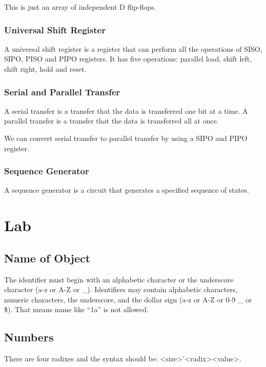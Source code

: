 \documentclass[a4paper,12pt]{article}
\begin{document}
This is just an array of independent D flip-flops.

\subsubsection{Universal Shift Register}

A universal shift register is a register that can perform all the operations of SISO, SIPO, PISO and PIPO registers.
It has five operations: parallel load, shift left, shift right, hold and reset.

\subsubsection{Serial and Parallel Transfer}

A serial transfer is a transfer that the data is transferred one bit at a time.
A parallel transfer is a transfer that the data is transferred all at once.

We can convert serial transfer to parallel transfer by using a SIPO and PIPO register.

\subsubsection{Sequence Generator}

A sequence generator is a circuit that generates a specified sequence of states.

\section{Lab}

\subsection{Name of Object}

The identifier must begin with an alphabetic character or the underscore character (a-z or A-Z or \_).
Identifiers may contain alphabetic characters, numeric characters, the underscore, and the dollar sign (a-z or A-Z or 0-9 \_ or \$).
That means name like ``1a'' is not allowed.

\subsection{Numbers}

There are four radixes and the syntax should be: <size>'<radix><value>.
\end{document}
